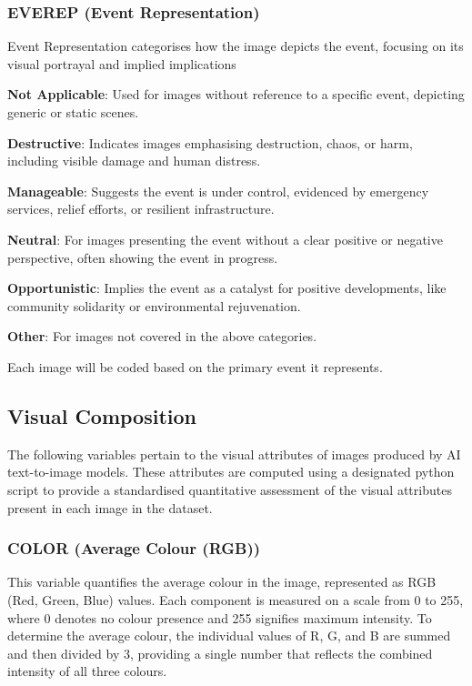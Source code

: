 \subsubsection*{EVEREP (Event Representation)}
\label{subsubsec:event-representation}
Event Representation categorises how the image depicts the event, focusing on its visual portrayal and implied implications

\begin{description}[leftmargin=2.5cm, style=multiline, labelwidth=1.5cm]
\item[0] \textbf{Not Applicable}: Used for images without reference to a specific event, depicting generic or static scenes.
\item[1] \textbf{Destructive}: Indicates images emphasising destruction, chaos, or harm, including visible damage and human distress.
\item[2] \textbf{Manageable}: Suggests the event is under control, evidenced by emergency services, relief efforts, or resilient infrastructure.
\item[3] \textbf{Neutral}: For images presenting the event without a clear positive or negative perspective, often showing the event in progress.
\item[4] \textbf{Opportunistic}: Implies the event as a catalyst for positive developments, like community solidarity or environmental rejuvenation.
\item[5] \textbf{Other}: For images not covered in the above categories.
\end{description}

Each image will be coded based on the primary event it represents.

\subsection{Visual Composition}

The following variables pertain to the visual attributes of images produced by AI text-to-image models. These attributes are computed using a designated python script to provide a standardised quantitative assessment of the visual attributes present in each image in the dataset.

\subsubsection*{COLOR (Average Colour (RGB))}
This variable quantifies the average colour in the image, represented as RGB (Red, Green, Blue) values. Each component is measured on a scale from 0 to 255, where 0 denotes no colour presence and 255 signifies maximum intensity. To determine the average colour, the individual values of R, G, and B are summed and then divided by 3, providing a single number that reflects the combined intensity of all three colours.



